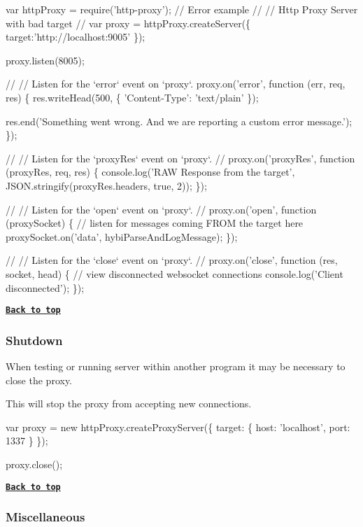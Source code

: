 \begin{DoxyCode}
var httpProxy = require('http-proxy');
// Error example
//
// Http Proxy Server with bad target
//
var proxy = httpProxy.createServer(\{
  target:'http://localhost:9005'
\});

proxy.listen(8005);

//
// Listen for the `error` event on `proxy`.
proxy.on('error', function (err, req, res) \{
  res.writeHead(500, \{
    'Content-Type': 'text/plain'
  \});

  res.end('Something went wrong. And we are reporting a custom error message.');
\});

//
// Listen for the `proxyRes` event on `proxy`.
//
proxy.on('proxyRes', function (proxyRes, req, res) \{
  console.log('RAW Response from the target', JSON.stringify(proxyRes.headers, true, 2));
\});

//
// Listen for the `open` event on `proxy`.
//
proxy.on('open', function (proxySocket) \{
  // listen for messages coming FROM the target here
  proxySocket.on('data', hybiParseAndLogMessage);
\});

//
// Listen for the `close` event on `proxy`.
//
proxy.on('close', function (res, socket, head) \{
  // view disconnected websocket connections
  console.log('Client disconnected');
\});
\end{DoxyCode}


{\bfseries \href{#table-of-contents}{\tt Back to top}}

\subsubsection*{Shutdown}


\begin{DoxyItemize}
\item When testing or running server within another program it may be necessary to close the proxy.
\item This will stop the proxy from accepting new connections.
\end{DoxyItemize}


\begin{DoxyCode}
var proxy = new httpProxy.createProxyServer(\{
  target: \{
    host: 'localhost',
    port: 1337
  \}
\});

proxy.close();
\end{DoxyCode}


{\bfseries \href{#table-of-contents}{\tt Back to top}}

\subsubsection*{Miscellaneous}

